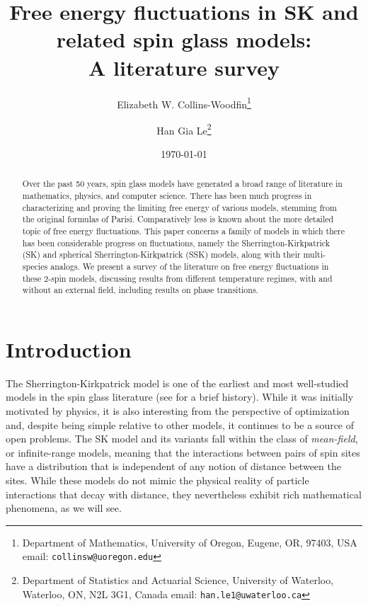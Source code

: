 \documentclass[11pt]{article}
\numberwithin{equation}{section}
\theoremstyle{remark}
\begin{document}
\title{Free energy fluctuations in SK and related spin glass models: \\ A literature survey}

\author{Elizabeth W. Collins-Woodfin\footnote{Department of Mathematics, University of Oregon,
Eugene, OR, 97403, USA \newline email: \texttt{collinsw@uoregon.edu}} 
\and 
Han Gia Le\footnote{Department of Statistics and Actuarial Science, University of Waterloo, Waterloo, ON, N2L 3G1, Canada \newline email: \texttt{han.le1@uwaterloo.ca}}}

	\date{\today}
	
	
	\maketitle

\begin{abstract}
Over the past 50 years, spin glass models have generated a broad range of literature in mathematics, physics, and computer science.  There has been much progress in characterizing and proving the limiting free energy of various models, stemming from the original formulas of Parisi.  Comparatively less is known about the more detailed topic of free energy fluctuations.  
This paper concerns a family of models in which there has been considerable progress on fluctuations, namely the Sherrington-Kirkpatrick (SK) and spherical Sherrington-Kirkpatrick (SSK) models, along with their multi-species analogs.  We present a survey of the literature on free energy fluctuations in these 2-spin models, discussing results from different temperature regimes, with and without an external field, including results on phase transitions.
\end{abstract}	

\section{Introduction}

The Sherrington-Kirkpatrick model \cite{SherringtonKirkpatrick1975} is one of the earliest and most well-studied models in the spin glass literature (see \cite{sherringtonkirkpatrick2025} for a brief history).  While it was initially motivated by physics, it is also interesting from the perspective of optimization and, despite being simple relative to other models, it continues to be a source of open problems.
The SK model and its variants fall within the class of \textit{mean-field}, or infinite-range models, meaning that the interactions between pairs of spin sites have a distribution that is independent of any notion of distance between the sites.  While these models do not mimic the physical reality of particle interactions that decay with distance, they nevertheless exhibit rich mathematical phenomena, as we will see.
\end{document}
